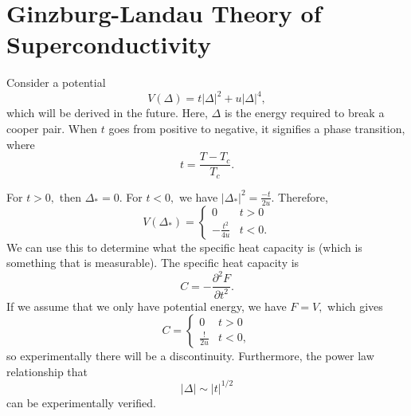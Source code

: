 \documentclass{article}
\numberwithin{equation}{section}
\begin{document}
\section{Ginzburg-Landau Theory of Superconductivity}
Consider a potential 
\begin{equation}
    V(\Delta) = t|\Delta|^2 + u|\Delta|^4,
\end{equation}
which will be derived in the future. Here, $\Delta$ is the energy required to break a cooper pair. When $t$ goes from positive to negative, it signifies a phase transition, where
\begin{equation}
    t = \frac{T-T_c}{T_c}.
\end{equation}
\begin{center}
\end{center}
For $t>0,$ then $\Delta_* =0.$ For $t<0,$ we have $|\Delta_*|^2 = \frac{-t}{2u}.$ Therefore,
\begin{equation}
    V(\Delta_*) = \begin{cases}
        0 & t>0 \\ 
        -\frac{t^2}{4u} & t<0.
    \end{cases}
\end{equation}
We can use this to determine what the specific heat capacity is (which is something that is measurable). The specific heat capacity is 
\begin{equation}
    C = -\frac{\partial^2 F}{\partial t^2}.
\end{equation}
If we assume that we only have potential energy, we have $F = V,$ which gives 
\begin{equation}
    C = \begin{cases}
        0 & t>0 \\ 
        \frac{!}{2u} & t< 0,
    \end{cases}
\end{equation}
so experimentally there will be a discontinuity. Furthermore, the power law relationship that 
\begin{equation}
    |\Delta| \sim |t|^{1/2}
\end{equation}
can be experimentally verified.
\end{document}

